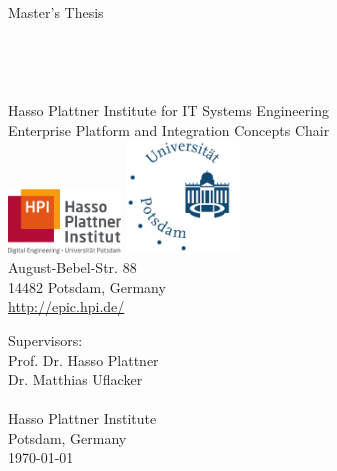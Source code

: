 \begin{titlepage}

\thispagestyle{empty}
\begin{center}
	\LARGE
	Master's Thesis\\
	\vspace{0.4cm}
	\Huge
    \TITLE{}\\
	\vspace{0.4cm}
	\large
    \SUBTITLE{}\\
	\vspace{0.5cm}
	\LARGE
	\textbf{\AUTHOR}\\
	\normalsize
  \Mail{\EMAIL}\\
	\vspace{0.4cm}
	\small
	Hasso Plattner Institute for IT Systems Engineering\\
	Enterprise Platform and Integration Concepts Chair\\
	\vspace{0.3cm}
	\includegraphics[width=3cm]{figures/hpi_logo_2017_cmyk_wb_sl1}
	\hspace{1cm}
	\includegraphics[width=3cm]{figures/Universitaet_Potsdam_logo}\\
	\vspace{0.1cm}
	August-Bebel-Str. 88\\
	14482 Potsdam, Germany\\
	\url{http://epic.hpi.de/}\\
\end{center}
Supervisors:
\vspace{0.3cm}\\
Prof. Dr. Hasso Plattner\\
Dr. Matthias Uflacker\\
\SUPERVISOR
\vspace{0.3cm}\\
Hasso Plattner Institute\\
Potsdam, Germany
\vspace{0.4cm}\\
\today
\end{titlepage}
